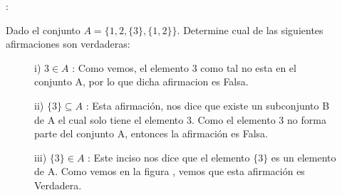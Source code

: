 \documentclass[10pt]{article}
\begin{document}
\begin{ej}:

Dado el conjunto $A=\{1,2,\{3\},\{1,2\}\}$. Determine cual de las siguientes afirmaciones son verdaderas:
\begin{itemize}
\begin{figure}[H]
\begin{minipage}[b]{0.4\linewidth}
		\centering
 \item[i)] $3 \in A$ : \sffamily Como vemos, el elemento 3 como tal no esta en el conjunto A, por lo que dicha afirmacion es  \textcolor{R}{Falsa}.    

\end{minipage}
\begin{minipage}[b]{0.5\linewidth}
		\centering
\item[ii)] $\{3\} \subseteq A$ : \sffamily Esta afirmación, nos dice que existe un subconjunto B de A el cual solo tiene el elemento 3. Como el elemento 3 no forma parte del conjunto A, entonces la afirmación es \textcolor{R}{Falsa}.

\item[iii)] $\{3\} \in A$ : \sffamily Este inciso nos dice que el elemento $\{3\}$ es un elemento de A. Como vemos en la figura , vemos que esta afirmación es \textcolor{G}{Verdadera}. 


\end{minipage}
\end{figure}
\end{itemize}
\end{ej}
\end{document}
